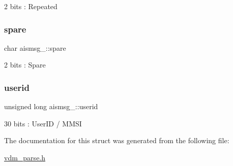 2 bits \+: Repeated 

\mbox{\label{structaismsg__8_a93279dd4cf452d1059570d2d544a192c}} 
\subsubsection{\texorpdfstring{spare}{spare}}
{\footnotesize\ttfamily char aismsg\+\_\+::spare}



2 bits \+: Spare 

\mbox{\label{structaismsg__8_a6360180e0963f7965b0584af6900c53a}} 
\subsubsection{\texorpdfstring{userid}{userid}}
{\footnotesize\ttfamily unsigned long aismsg\+\_\+::userid}



30 bits \+: User\+ID / M\+M\+SI 



The documentation for this struct was generated from the following file\+:\begin{DoxyCompactItemize}
\item 
\mbox{\hyperlink{vdm__parse_8h}{vdm\+\_\+parse.\+h}}\end{DoxyCompactItemize}
